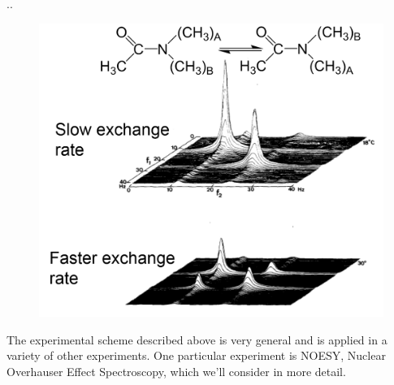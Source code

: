 \documentclass[handout]{beamer}
\begin{document}
\begin{frame}{\thesection.\thesubsection. \insertsubsection}
  \begin{figure}
  	\centering
  	\includegraphics[scale=0.4]{figures/NNdimethylacetamide.png}
  \end{figure}

The experimental scheme described above is very general and is applied in a variety of other experiments. One particular experiment is \alert{NOESY, Nuclear Overhauser Effect Spectroscopy,} which we'll consider in more detail.

\end{frame}
\end{document}
